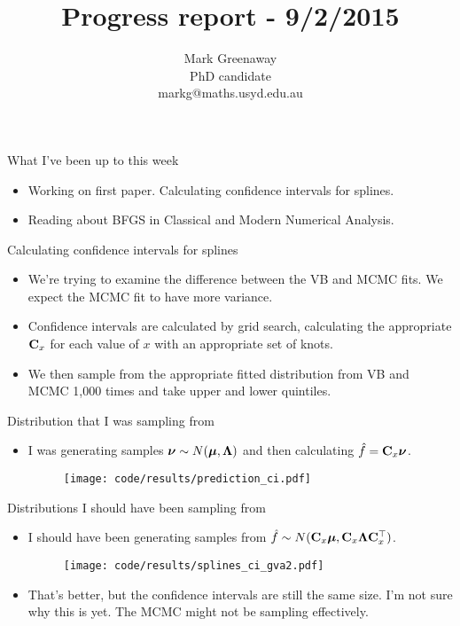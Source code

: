 \documentclass{beamer}
\title{Progress report - 9/2/2015}
\author{Mark Greenaway\\PhD candidate\\markg@maths.usyd.edu.au}
\begin{document}
\begin{frame}
\maketitle
\end{frame}

\begin{frame}{What I've been up to this week}
\begin{itemize}
\item Working on first paper. Calculating confidence intervals for splines.
\item Reading about BFGS in Classical and Modern Numerical Analysis.
\end{itemize}
\end{frame}

\begin{frame}{Calculating confidence intervals for splines}
\begin{itemize}
\item We're trying to examine the difference between the VB and MCMC fits.
We expect the MCMC fit to have more variance.
\item Confidence intervals are calculated by grid search, calculating the
appropriate ${\bf C}_x$ for each value of $x$ with an appropriate set of knots.
\item We then sample from the appropriate fitted distribution from VB and MCMC 
1,000 times and take upper and lower quintiles.
\end{itemize}
\end{frame}

\begin{frame}{Distribution that I was sampling from}
\begin{itemize}
\item I was generating samples ${\boldsymbol \nu} \sim N({\boldsymbol \mu}, {\boldsymbol \Lambda})$ and then 
calculating $\hat{f} = {\bf C}_x {\boldsymbol \nu}$.
\begin{figure}
\texttt{[image: code/results/prediction\_ci.pdf]}
\end{figure}
\end{itemize}
\end{frame}

\begin{frame}{Distributions I should have been sampling from}
\begin{itemize}
\item I should have been generating samples from $\hat{f} \sim N({\bf C}_x {\boldsymbol \mu}, {\bf C}_x {\boldsymbol \Lambda} {\bf C}_x^\top)$.
\begin{figure}
\texttt{[image: code/results/splines\_ci\_gva2.pdf]}
\end{figure}
\item That's better, but the confidence intervals are still the same size.
I'm not sure why this is yet. The MCMC might not be sampling effectively.
\end{itemize}
\end{frame}
\end{document}
